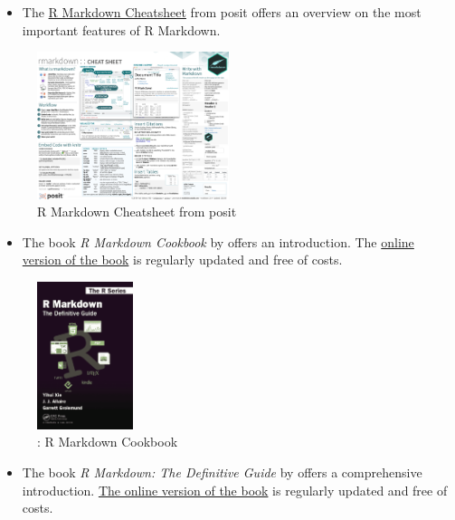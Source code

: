 \documentclass[
  12pt,
  oneside]{book}
\providecommand{\tightlist}{%
  \setlength{\itemsep}{0pt}\setlength{\parskip}{0pt}}
\theoremstyle{definition}
\theoremstyle{definition}
\theoremstyle{definition}
\theoremstyle{definition}
\theoremstyle{remark}
\begin{document}
\begin{itemize}
\tightlist
\item
  The \href{https://raw.githubusercontent.com/rstudio/cheatsheets/main/rmarkdown.pdf}{R Markdown Cheatsheet} from posit offers an overview on the most important features of R Markdown.
\end{itemize}

\begin{figure}
\centering
\includegraphics[width=0.5\textwidth,height=\textheight]{fig/rmdcheat.png}
\caption{\label{fig:rmdcheat} R Markdown Cheatsheet from posit}
\end{figure}

\begin{itemize}
\tightlist
\item
  The book \emph{R Markdown Cookbook} by \citet{Xie2020R} offers an introduction. The \href{https://bookdown.org/yihui/rmarkdown-cookbook}{online version of the book} is regularly updated and free of costs.
\end{itemize}

\begin{figure}
\centering
\includegraphics[width=0.25\textwidth,height=\textheight]{fig/rmarkdownbook.png}
\caption{\citet{Xie2020R}: R Markdown Cookbook}
\end{figure}

\begin{itemize}
\tightlist
\item
  The book \emph{R Markdown: The Definitive Guide} by \citet{Xie2018R} offers a comprehensive introduction. \href{https://bookdown.org/yihui/rmarkdown}{The online version of the book} is regularly updated and free of costs.
\end{itemize}
\end{document}
